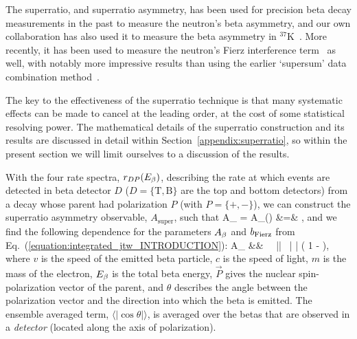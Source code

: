 The superratio, and superratio asymmetry, has been used for precision beta decay measurements in the past to measure the neutron's beta asymmetry\cite{UCNA_first_superratio}, and our own collaboration has also used it to measure the beta asymmetry in $^{37}$K~\cite{ben_Abeta}.  More recently, it has been used to measure the neutron's Fierz interference term~\cite{UCNAfierz2020}\cite{Saul2020} as well, with notably more impressive results than using the earlier `supersum' data combination method~\cite{UCNA_first_Fierz}.  

The key to the effectiveness of the superratio technique is that many systematic effects can be made to cancel at the leading order, at the cost of some statistical resolving power.  The mathematical details of the superratio construction and its results are discussed in detail within Section~\ref{appendix:superratio}, so within the present section we will limit ourselves to a discussion of the results.


With the four rate spectra, $r_{D P}(E_{\beta})$, describing the rate at which events are detected in beta detector $D$ ($D =\{ \mathrm{T, B}  \}$ are the top and bottom detectors) from a decay whose parent had polarization $P$ (with $P=\{+,-\}$), we can construct the superratio asymmetry observable, $A_{\mathrm{super}}$, such that
\bea
A_{} \;\;=\;\; A_{}(\Ebeta) 
&=& ,
\eea
and we find the following dependence for the parameters $A_{\beta}$ and $b_{\mathrm{Fierz}}$ from Eq.~(\ref{equation:integrated_jtw_INTRODUCTION}):
\bea
A_{} &\approx& \Abeta \,  \, || \, \langle | \cos\theta | \rangle \left( 1 - \bFierz {} \right), 
\eea
where $v$ is the speed of the emitted beta particle, $c$ is the speed of light, $m$ is the mass of the electron, $E_{\beta}$ is the total beta energy, $\vec{P}$ gives the nuclear spin-polarization vector of the parent, and $\theta$ describes the angle between the polarization vector and the direction into which the beta is emitted.  The ensemble averaged term, $\langle | \cos\theta | \rangle$, is averaged over the betas that are observed in a \emph{detector} (located along the axis of polarization).

